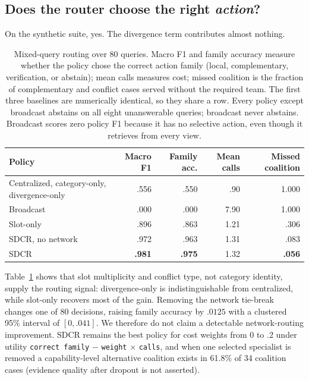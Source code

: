 \documentclass{article}
\begin{document}
\subsection{Does the router choose the right \emph{action}?}
On the synthetic suite, yes. The divergence term contributes almost nothing.

\begin{table}[t]
\centering
\caption{Mixed-query routing over 80 queries. Macro F1 and family accuracy measure whether the policy chose the correct action family (local, complementary, verification, or abstain); mean calls measures cost; missed coalition is the fraction of complementary and conflict cases served without the required team. The first three baselines are numerically identical, so they share a row. Every policy except broadcast abstains on all eight unanswerable queries; broadcast never abstains. Broadcast scores zero policy F1 because it has no selective action, even though it retrieves from every view.}
\label{tab:routing}
\small
\begin{tabular}{lrrrr}
\toprule
Policy & Macro F1 & Family acc. & Mean calls & Missed coalition\\
\midrule
Centralized, category-only, divergence-only & .556 & .550 & .90 & 1.000\\
Broadcast & .000 & .000 & 7.90 & 1.000\\
Slot-only & .896 & .863 & 1.21 & .306\\
SDCR, no network & .972 & .963 & 1.31 & .083\\
SDCR & \textbf{.981} & \textbf{.975} & 1.32 & \textbf{.056}\\
\bottomrule
\end{tabular}
\end{table}

Table~\ref{tab:routing} shows that slot multiplicity and conflict type, not category identity, supply the routing signal: divergence-only is indistinguishable from centralized, while slot-only recovers most of the gain. Removing the network tie-break changes one of 80 decisions, raising family accuracy by $.0125$ with a clustered 95\% interval of $[0,.041]$. We therefore do not claim a detectable network-routing improvement. SDCR remains the best policy for cost weights from 0 to .2 under utility \texttt{correct family} $-$ \texttt{weight} $\times$ \texttt{calls}, and when one selected specialist is removed a capability-level alternative coalition exists in 61.8\% of 34 coalition cases (evidence quality after dropout is not asserted).
\end{document}
